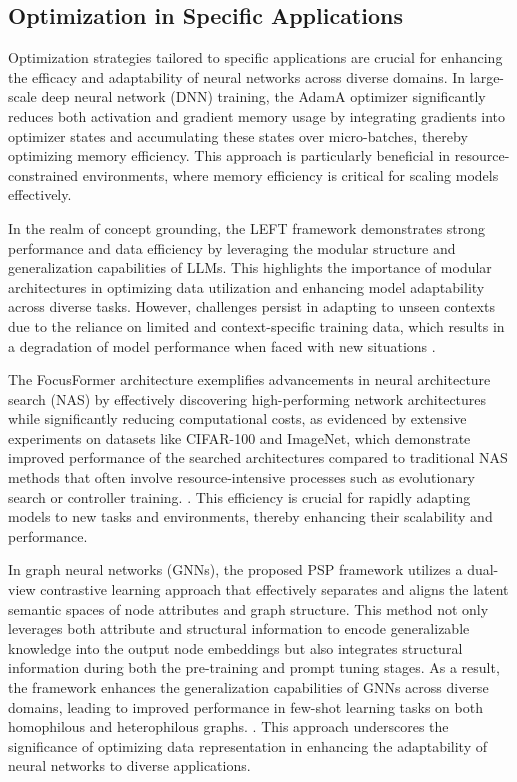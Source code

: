 
\subsection{Optimization in Specific Applications} \label{subsec:Optimization in Specific Applications}

Optimization strategies tailored to specific applications are crucial for enhancing the efficacy and adaptability of neural networks across diverse domains. In large-scale deep neural network (DNN) training, the AdamA optimizer significantly reduces both activation and gradient memory usage by integrating gradients into optimizer states and accumulating these states over micro-batches, thereby optimizing memory efficiency. This approach is particularly beneficial in resource-constrained environments, where memory efficiency is critical for scaling models effectively. 



In the realm of concept grounding, the LEFT framework demonstrates strong performance and data efficiency by leveraging the modular structure and generalization capabilities of LLMs. This highlights the importance of modular architectures in optimizing data utilization and enhancing model adaptability across diverse tasks. However, challenges persist in adapting to unseen contexts due to the reliance on limited and context-specific training data, which results in a degradation of model performance when faced with new situations \cite{kaur2024cropcontextwiserobuststatic}.



The FocusFormer architecture exemplifies advancements in neural architecture search (NAS) by effectively discovering high-performing network architectures while significantly reducing computational costs, as evidenced by extensive experiments on datasets like CIFAR-100 and ImageNet, which demonstrate improved performance of the searched architectures compared to traditional NAS methods that often involve resource-intensive processes such as evolutionary search or controller training. \cite{liu2022focusformerfocusingneedarchitecture}. This efficiency is crucial for rapidly adapting models to new tasks and environments, thereby enhancing their scalability and performance. 



In graph neural networks (GNNs), the proposed PSP framework utilizes a dual-view contrastive learning approach that effectively separates and aligns the latent semantic spaces of node attributes and graph structure. This method not only leverages both attribute and structural information to encode generalizable knowledge into the output node embeddings but also integrates structural information during both the pre-training and prompt tuning stages. As a result, the framework enhances the generalization capabilities of GNNs across diverse domains, leading to improved performance in few-shot learning tasks on both homophilous and heterophilous graphs. \cite{ge2024psppretrainingstructureprompt}. This approach underscores the significance of optimizing data representation in enhancing the adaptability of neural networks to diverse applications.



